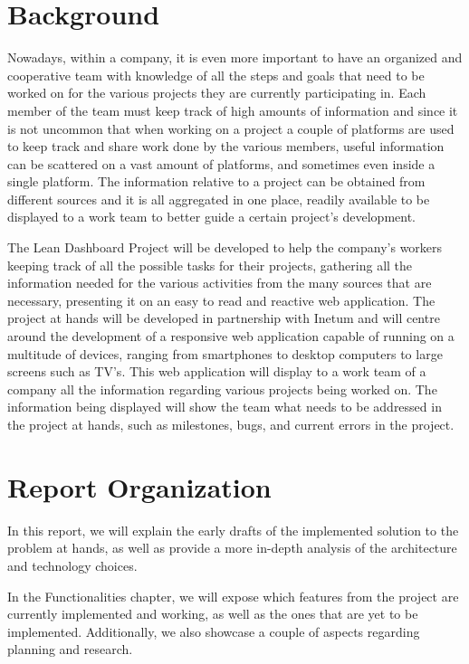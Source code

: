 \documentclass[a4paper,twoside,10pt]{report}
\begin{document}
\section{Background}
Nowadays, within a company, it is even more important to have an organized and cooperative team with knowledge of all the steps and goals that need to be worked on for the various projects they are currently participating in.
Each member of the team must keep track of high amounts of information and since it is not uncommon that when working on a project a couple of platforms are used to keep track and share work done by the various members, useful information can be scattered on a vast amount of platforms, and sometimes even inside a single platform.
The information relative to a project can be obtained from different sources and it is all aggregated in one place, readily available to be displayed to a work team to better guide a certain project's development.

The Lean Dashboard Project will be developed to help the company's workers keeping track of all the possible tasks for their projects, gathering all the information needed for the various activities from the many sources that are necessary, presenting it on an easy to read and reactive web application.
The project at hands will be developed in partnership with Inetum\cite{INETUM} and will centre around the development of a responsive web application capable of running on a multitude of devices, ranging from smartphones to desktop computers to large screens such as TV’s. This web application will display to a work team of a company all the information regarding various projects being worked on. 
The information being displayed will show the team what needs to be addressed in the project at hands, such as milestones, bugs, and current errors in the project.

\newpage
\section{Report Organization}
In this report, we will explain the early drafts of the implemented solution to the problem at hands, as well as provide a more in-depth analysis of the architecture and technology choices.

In the Functionalities chapter, we will expose which features from the project are currently implemented and working, as well as the ones that are yet to be implemented. Additionally, we also showcase a couple of aspects regarding planning and research.
\end{document}
